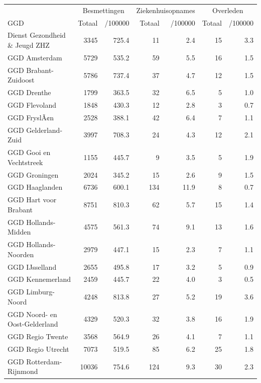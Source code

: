 \documentclass[
  english,
  man,floatsintext]{apa6}
\begin{document}
\begin{table}
\centering\begingroup\fontsize{10}{12}\selectfont

\begin{threeparttable}
\begin{tabular}{lrrrrrr}
\toprule
\multicolumn{1}{c}{ } & \multicolumn{2}{c}{Besmettingen} & \multicolumn{2}{c}{Ziekenhuisopnames} & \multicolumn{2}{c}{Overleden} \\
\cmidrule(l{3pt}r{3pt}){2-3} \cmidrule(l{3pt}r{3pt}){4-5} \cmidrule(l{3pt}r{3pt}){6-7}
GGD & Totaal & /100000 & Totaal & /100000 & Totaal & /100000\\
\midrule
Dienst Gezondheid \& Jeugd ZHZ & 3345 & 725.4 & 11 & 2.4 & 15 & 3.3\\
GGD Amsterdam & 5729 & 535.2 & 59 & 5.5 & 16 & 1.5\\
GGD Brabant-Zuidoost & 5786 & 737.4 & 37 & 4.7 & 12 & 1.5\\
GGD Drenthe & 1799 & 363.5 & 32 & 6.5 & 5 & 1.0\\
GGD Flevoland & 1848 & 430.3 & 12 & 2.8 & 3 & 0.7\\
GGD FryslÃ¢n & 2528 & 388.1 & 42 & 6.4 & 7 & 1.1\\
GGD Gelderland-Zuid & 3997 & 708.3 & 24 & 4.3 & 12 & 2.1\\
GGD Gooi en Vechtstreek & 1155 & 445.7 & 9 & 3.5 & 5 & 1.9\\
GGD Groningen & 2024 & 345.2 & 15 & 2.6 & 9 & 1.5\\
GGD Haaglanden & 6736 & 600.1 & 134 & 11.9 & 8 & 0.7\\
GGD Hart voor Brabant & 8751 & 810.3 & 62 & 5.7 & 15 & 1.4\\
GGD Hollands-Midden & 4575 & 561.3 & 74 & 9.1 & 13 & 1.6\\
GGD Hollands-Noorden & 2979 & 447.1 & 15 & 2.3 & 7 & 1.1\\
GGD IJsselland & 2655 & 495.8 & 17 & 3.2 & 5 & 0.9\\
GGD Kennemerland & 2459 & 445.7 & 22 & 4.0 & 3 & 0.5\\
GGD Limburg-Noord & 4248 & 813.8 & 27 & 5.2 & 19 & 3.6\\
GGD Noord- en Oost-Gelderland & 4329 & 520.3 & 32 & 3.8 & 16 & 1.9\\
GGD Regio Twente & 3568 & 564.9 & 26 & 4.1 & 7 & 1.1\\
GGD Regio Utrecht & 7073 & 519.5 & 85 & 6.2 & 25 & 1.8\\
GGD Rotterdam-Rijnmond & 10036 & 754.6 & 124 & 9.3 & 30 & 2.3\\

\end{tabular}
\end{threeparttable}
\end{table}
\end{document}
